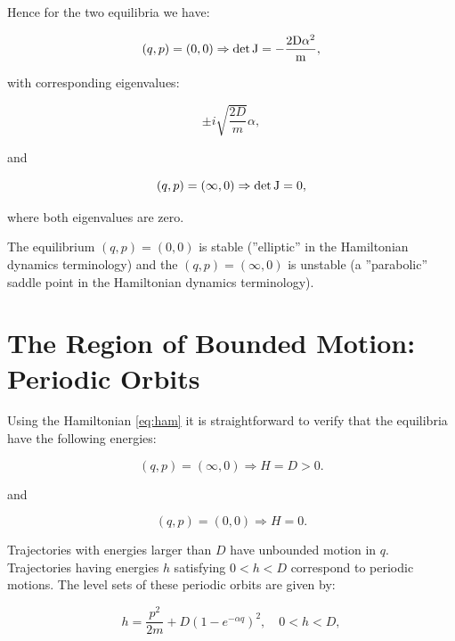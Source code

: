 \documentclass{ws-ijbc}
\begin{document}
\noindent
Hence for the two equilibria we have:



\begin{equation}
(q, p) = (0, 0) \Rightarrow \rm{det} \, J = -\frac{2D \alpha ^2}{m},
\label{eq:eqstab}
\end{equation}

\noindent
with corresponding eigenvalues:

\begin{equation}
\pm i\sqrt{\frac{2D}{m}} \alpha,
\label{eq:imageivs}
\end{equation}

\noindent
and

\begin{equation}
(q, p) = (\infty, 0) \Rightarrow \rm{det} \, J =0,
\label{eq:eqsad}
\end{equation}

\noindent
where both eigenvalues are zero.

The equilibrium $(q, p) = (0, 0)$ is stable (''elliptic'' in the Hamiltonian dynamics terminology) and the
 $(q, p) = (\infty, 0)$ is unstable (a ''parabolic'' saddle point  in the Hamiltonian dynamics terminology). 


\section{The Region of Bounded Motion: Periodic Orbits}
\label{eq:po}

Using the Hamiltonian \eqref{eq:ham} it is straightforward to verify that the equilibria have the following energies:


\begin{equation}
(q, p) = (\infty, 0) \Rightarrow H=D >0.
\end{equation}

\noindent
and

\begin{equation}
(q, p) = (0, 0) \Rightarrow H=0.
\end{equation}

\noindent
Trajectories with energies larger than $D$  have unbounded motion in $q$. Trajectories having energies $h$ satisfying $0< h < D$ correspond to periodic motions. The level sets of these periodic orbits are given by:

\begin{equation}
h= \frac{p^2}{2m} + D \left( 1-e^{-\alpha q} \right)^2, \quad 0< h < D,
\label{eq:tp1}
\end{equation}
\end{document}
